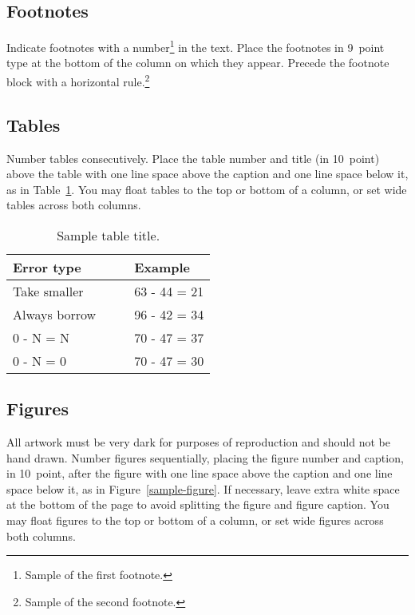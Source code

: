 \documentclass[10pt,letterpaper]{article}
\begin{document}
\subsection{Footnotes}

Indicate footnotes with a number\footnote{Sample of the first
footnote.} in the text. Place the footnotes in 9~point type at the
bottom of the column on which they appear. Precede the footnote block
with a horizontal rule.\footnote{Sample of the second footnote.}


\subsection{Tables}

Number tables consecutively. Place the table number and title (in
10~point) above the table with one line space above the caption and
one line space below it, as in Table~\ref{sample-table}. You may float
tables to the top or bottom of a column, or set wide tables across
both columns.

\begin{table}[!ht]
\begin{center} 
\caption{Sample table title.} 
\label{sample-table} 
\vskip 0.12in
\begin{tabular}{ll} 
\hline
Error type    &  Example \\
\hline
Take smaller        &   63 - 44 = 21 \\
Always borrow~~~~   &   96 - 42 = 34 \\
0 - N = N           &   70 - 47 = 37 \\
0 - N = 0           &   70 - 47 = 30 \\
\hline
\end{tabular} 
\end{center} 
\end{table}


\subsection{Figures}

All artwork must be very dark for purposes of reproduction and should
not be hand drawn. Number figures sequentially, placing the figure
number and caption, in 10~point, after the figure with one line space
above the caption and one line space below it, as in
Figure~\ref{sample-figure}. If necessary, leave extra white space at
the bottom of the page to avoid splitting the figure and figure
caption. You may float figures to the top or bottom of a column, or
set wide figures across both columns.
\end{document}
